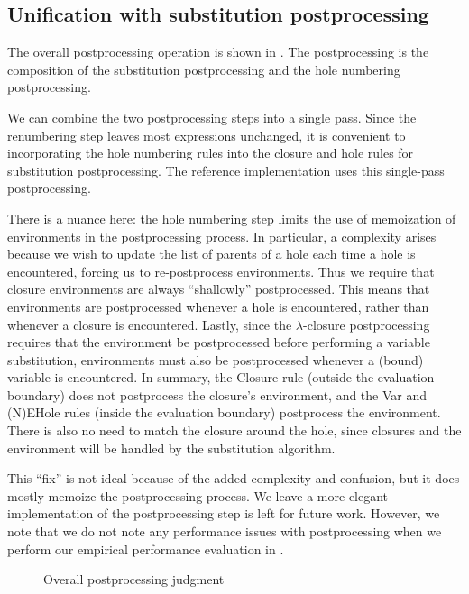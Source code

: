 \subsection{Unification with substitution postprocessing}
\label{sec:unification-postprocessing}

The overall postprocessing operation is shown in . The postprocessing is the composition of the substitution postprocessing and the hole numbering postprocessing.

We can combine the two postprocessing steps into a single pass. Since the renumbering step leaves most expressions unchanged, it is convenient to incorporating the hole numbering rules into the closure and hole rules for substitution postprocessing. The reference implementation uses this single-pass postprocessing.

There is a nuance here: the hole numbering step limits the use of memoization of environments in the postprocessing process. In particular, a complexity arises because we wish to update the list of parents of a hole each time a hole is encountered, forcing us to re-postprocess environments. Thus we require that closure environments are always ``shallowly'' postprocessed. This means that environments are postprocessed whenever a hole is encountered, rather than whenever a closure is encountered. Lastly, since the $\lambda$-closure postprocessing requires that the environment be postprocessed before performing a variable substitution, environments must also be postprocessed whenever a (bound) variable is encountered. In summary, the \pplcl{}Closure rule (outside the evaluation boundary) does not postprocess the closure's environment, and the \pplcl{}Var and \pplcl{}(N)EHole rules (inside the evaluation boundary) postprocess the environment. There is also no need to match the closure around the hole, since closures and the environment will be handled by the substitution algorithm.

This ``fix'' is not ideal because of the added complexity and confusion, but it does mostly memoize the postprocessing process. We leave a more elegant implementation of the postprocessing step is left for future work. However, we note that we do not note any performance issues with postprocessing when we perform our empirical performance evaluation in .

\begin{figure}
  \centering
  \begin{mdframed}
    \begin{singlespace}
      
    \end{singlespace}
  \end{mdframed}
  \caption{Overall postprocessing judgment}
  \label{fig:big-step-postprocessing-rules}
\end{figure}

